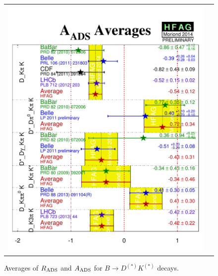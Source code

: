 \begin{figure}[htb]
\begin{center}
\begin{tabular}{cc}
{        \includegraphics{figures/cp_uta/A_ADS}
      }
    \end{tabular}
  \end{center}
  \vspace{-0.8cm}
  \caption{
    Averages of $R_{\rm ADS}$ and $A_{\rm ADS}$ for $B \to D^{(*)}K^{(*)}$ decays.
  }
  \label{fig:cp_uta:cus:ads}
\end{figure}

